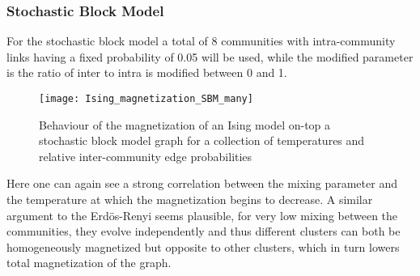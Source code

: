 \subsubsection{Stochastic Block Model}
For the stochastic block model a total of 8 communities with intra-community links having a fixed probability of \num{0.05} will be used, while the modified parameter is the ratio of inter to intra is modified between 0 and 1.
\begin{figure}[h]
	\centering
	\texttt{[image: Ising\_magnetization\_SBM\_many]}
	\caption{Behaviour of the magnetization of an Ising model on-top a stochastic block model graph for a collection of temperatures and relative inter-community edge probabilities}
	\label{fig:M-SBM-0.1}
\end{figure}
Here one can again see a strong correlation between the mixing parameter and the temperature at which the magnetization begins to decrease.
A similar argument to the Erdös-Renyi seems plausible, for very low mixing between the communities, they evolve independently and thus different clusters can both be homogeneously magnetized but opposite to other clusters, which in turn lowers total magnetization of the graph.

\newpage